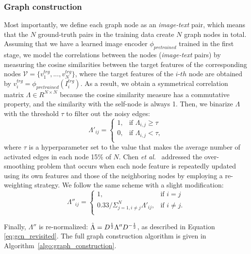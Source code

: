 \documentclass[10pt,twocolumn,letterpaper]{article}
\begin{document}
\subsubsection{Graph construction}
Most importantly, we define each graph node as an \textit{image-text} pair, which means that the $N$ ground-truth pairs in the training data create $N$ graph nodes in total. Assuming that we have a learned image encoder $\phi_{pretrained}$ trained in the first stage, we model the correlations between the nodes (\textit{image-text} pairs) by measuring the cosine similarities between the target features of the corresponding nodes $\mathcal{V} = \{v^{trg}_{1}, ... , v^{trg}_{N}\}$, where the target features of the $i$-$th$ node are obtained by $v^{trg}_{i} = \phi_{pretrained}(I_{i}^{trg})$. As a result, we obtain a symmetrical correlation matrix $\Lambda \in R^{N \times N}$ because the cosine similarity measure has a commutative property, and the similarity with the self-node is always 1. Then, we binarize $\Lambda$ with the threshold $\tau$ to filter out the noisy edges:
\begin{equation}
    \label{eq:binarized}
    \Lambda'_{ij} =
    \begin{cases}
        1, & \text{if } \Lambda_{i,j} \geq \tau \\
        0, & \text{if } \Lambda_{i,j} < \tau, \\
    \end{cases}
\end{equation}
where $\tau$ is a hyperparameter set to the value that makes the average number of activated edges in each node 15\% of $N$. Chen \textit{et al.}~\cite{chen2019multi} addressed the over-smoothing problem that occurs when each node feature is repeatedly updated using its own features and those of the neighboring nodes by employing a re-weighting strategy. We follow the same scheme with a slight modification:
\begin{equation}
    \label{eq:reweighted}
    {\Lambda''}_{ij} =
    \begin{cases}
        1, & \text{if } i = j\\
        0.33 / \Sigma_{j=1, i \neq j}^{N}\Lambda'_{ij}, & \text{if } i \neq j. \\
    \end{cases}
\end{equation}

Finally, $ \Lambda''$ is re-normalized: $\hat{\Lambda} = D^{\frac{1}{2}}\Lambda'' D^{- \\ \frac{1}{2}}$, as described in Equation~ \ref{eq:gcn_revisited}.
The full graph construction algorithm is given in Algorithm~\ref{algo:graph_construction}.
\end{document}
